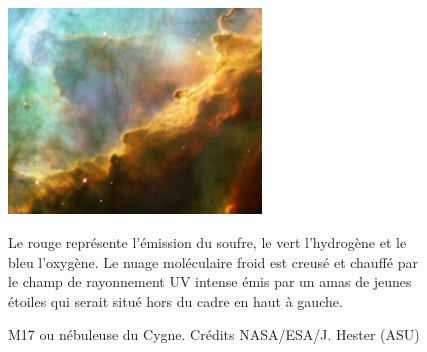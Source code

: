\documentclass[11pt,a4paper]{article}
\begin{document}
\begin{spacing}{0.98}
\begin{figure}[!p]
    \centering
    \includegraphics[trim = {0 0 0 0},clip, width=0.6\textwidth]{figure/omega.pdf}
    \vspace{1em}
    \caption{M17 ou nébuleuse du Cygne.
    Crédits NASA/ESA/J. Hester (ASU)}
    \vspace{1em}
    \begin{minipage}{\textwidth}
    Le rouge représente l'émission du soufre, le vert l'hydrogène et le bleu l'oxygène. Le nuage moléculaire froid est creusé et chauffé par le champ de rayonnement UV intense émis par un amas de jeunes étoiles qui serait situé hors du cadre en haut à gauche.
    \end{minipage} 
    \label{fig:m17}
\end{figure}{}



\end{spacing}
\end{document}

